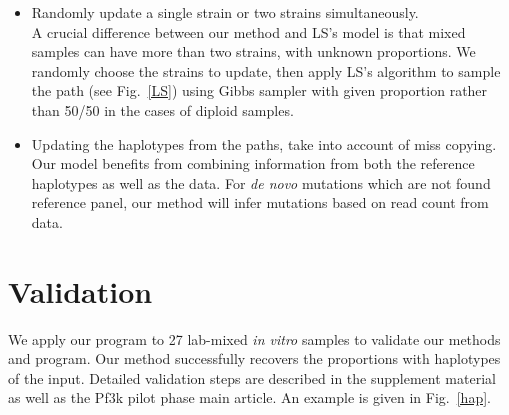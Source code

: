 \documentclass{bioinfo}
\begin{document}
\begin{methods}
\begin{itemize}
\item Randomly update a single strain or two strains simultaneously.\\
A crucial difference between our method and LS's model is that mixed samples can have more than two strains, with unknown proportions. We randomly choose the strains to update, then apply LS's algorithm to sample the path (see Fig.~\ref{LS}) using Gibbs sampler with given proportion rather than 50/50 in the cases of diploid samples.
\item Updating the haplotypes from the paths, take into account of miss copying. Our model benefits from combining information from both the reference haplotypes as well as the data. For {\em de novo} mutations which are not found reference panel, our method will infer mutations based on read count from data.


\end{itemize}

\section{Validation}
We apply our program to 27 lab-mixed {\em in vitro} samples \citep{Wendler2015} to validate our methods and program. Our method successfully recovers the proportions with haplotypes of the input. Detailed validation steps are described in the supplement material as well as the Pf3k pilot phase main article. An example is given in Fig.~\ref{hap}.
\end{methods}
\end{document}
